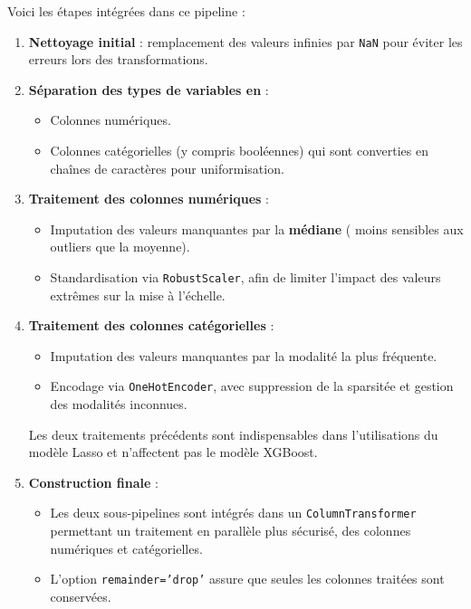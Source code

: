 Voici les étapes intégrées dans ce pipeline :

\begin{enumerate}
\item 
\textbf{Nettoyage initial} : remplacement des valeurs infinies par 
 \texttt{NaN} pour éviter les erreurs lors des transformations.
 
\item 
   \textbf{Séparation des types de variables en} :
  \begin{itemize}
    \item Colonnes numériques.
    \item Colonnes catégorielles (y compris booléennes) qui sont converties en chaînes de caractères pour uniformisation.
  \end{itemize}
  
\item 
   \textbf{Traitement des colonnes numériques} :
  \begin{itemize}
    \item Imputation des valeurs manquantes par la \textbf{médiane} ( moins sensibles aux outliers que la moyenne).
    \item Standardisation via \texttt{RobustScaler}, afin de limiter l’impact des valeurs extrêmes sur la mise à l’échelle.
    \end{itemize}
  
\item 
   \textbf{Traitement des colonnes catégorielles} :
  \begin{itemize}
    \item Imputation des valeurs manquantes par la modalité la plus fréquente.
    \item Encodage via \texttt{OneHotEncoder}, avec suppression de la sparsitée et gestion des modalités inconnues.
  \end{itemize}
Les deux traitements précédents sont indispensables dans l'utilisations du modèle Lasso et n'affectent pas le modèle XGBoost.

\item 
  \textbf{Construction finale} :
  \begin{itemize}
    \item Les deux sous-pipelines sont intégrés dans un \texttt{ColumnTransformer} permettant un traitement en parallèle plus sécurisé, des colonnes numériques et catégorielles.
    \item L’option \texttt{remainder='drop'} assure que seules les colonnes traitées sont conservées.
  \end{itemize}
\end{enumerate}

